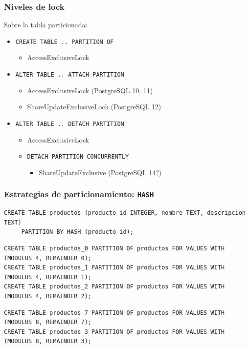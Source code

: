 \documentclass[ignorenonframetext,t]{beamer}
\begin{document}
\begin{frame}
	\frametitle{Niveles de lock}

	Sobre la tabla particionada:
	\begin{itemize}
		\item \texttt{CREATE TABLE .. PARTITION OF}
			\begin{itemize}
				\item AccessExclusiveLock
			\end{itemize}
			\pause
		\item \texttt{ALTER TABLE .. ATTACH PARTITION}
			\begin{itemize}
				\item AccessExclusiveLock (PostgreSQL 10, 11)
				\item ShareUpdateExclusiveLock (PostgreSQL 12)
			\end{itemize}
			\pause
		\item \texttt{ALTER TABLE .. DETACH PARTITION}
			\begin{itemize}
				\item AccessExclusiveLock
				\item \texttt{DETACH PARTITION CONCURRENTLY}
					\begin{itemize}
						\item ShareUpdateExclusive (PostgreSQL 14?)
					\end{itemize}
			\end{itemize}
	\end{itemize}
\end{frame}

\begin{frame}[fragile]
	\frametitle{Estrategias de particionamiento: \texttt{HASH}}
\begin{lstlisting}
CREATE TABLE productos (producto_id INTEGER, nombre TEXT, descripcion TEXT)
     PARTITION BY HASH (producto_id);
\end{lstlisting}
\pause
\begin{lstlisting}
CREATE TABLE productos_0 PARTITION OF productos FOR VALUES WITH (MODULUS 4, REMAINDER 0);
CREATE TABLE productos_1 PARTITION OF productos FOR VALUES WITH (MODULUS 4, REMAINDER 1);
CREATE TABLE productos_2 PARTITION OF productos FOR VALUES WITH (MODULUS 4, REMAINDER 2);
\end{lstlisting}
\pause
\begin{lstlisting}
CREATE TABLE productos_7 PARTITION OF productos FOR VALUES WITH (MODULUS 8, REMAINDER 7);
CREATE TABLE productos_3 PARTITION OF productos FOR VALUES WITH (MODULUS 8, REMAINDER 3);
\end{lstlisting}
\end{frame}
\end{document}
